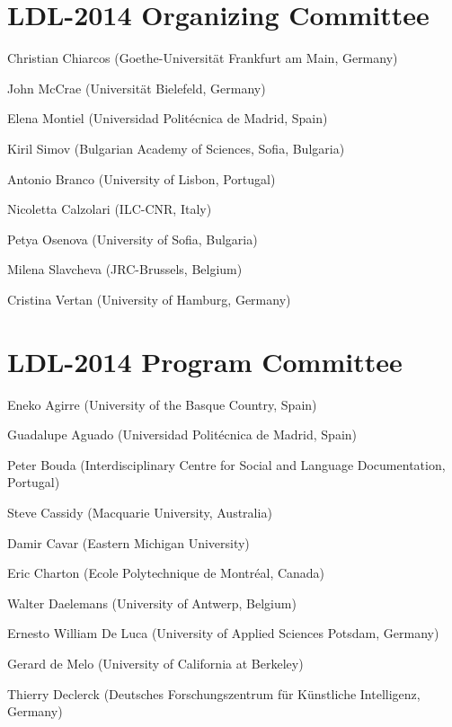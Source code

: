 \documentclass[10pt, a4paper]{article}
\begin{document}
\begin{figure*}[t]
\begin{minipage}{\textwidth}
\section*{LDL-2014 Organizing Committee}

\smallskip

Christian Chiarcos (Goethe-Universität Frankfurt am Main, Germany)

John McCrae (Universität Bielefeld, Germany)

Elena Montiel (Universidad Politécnica de Madrid, Spain)

Kiril Simov (Bulgarian Academy of Sciences, Sofia, Bulgaria)

Antonio Branco (University of Lisbon, Portugal)

Nicoletta Calzolari (ILC-CNR, Italy)

Petya Osenova (University of Sofia, Bulgaria)

Milena Slavcheva (JRC-Brussels, Belgium)

Cristina Vertan (University of Hamburg, Germany)

\bigskip

\section*{LDL-2014 Program Committee}

\smallskip


Eneko Agirre (University of the Basque Country, Spain)

Guadalupe Aguado (Universidad Politécnica de Madrid, Spain)

Peter Bouda (Interdisciplinary Centre for Social and Language Documentation, Portugal)

Steve Cassidy (Macquarie University, Australia)

Damir Cavar (Eastern Michigan University)

Eric Charton (Ecole Polytechnique de Montréal, Canada)

Walter Daelemans (University of Antwerp, Belgium)

Ernesto William De Luca (University of Applied Sciences Potsdam, Germany)

Gerard de Melo (University of California at Berkeley)

Thierry Declerck (Deutsches Forschungszentrum für Künstliche Intelligenz, Germany)


\end{minipage}
\end{figure*}
\end{document}

